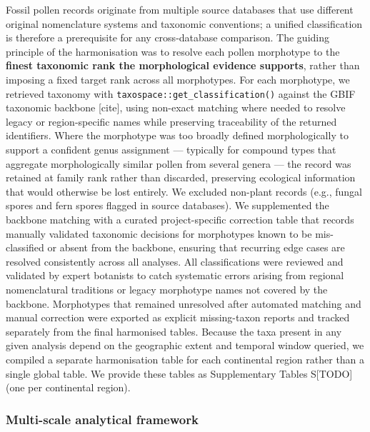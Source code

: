 \documentclass[
  12pt,
]{article}
\begin{document}
Fossil pollen records originate from multiple source databases that use
different original nomenclature systems and taxonomic conventions; a
unified classification is therefore a prerequisite for any
cross-database comparison. The guiding principle of the harmonisation
was to resolve each pollen morphotype to the \textbf{finest taxonomic
rank the morphological evidence supports}, rather than imposing a fixed
target rank across all morphotypes. For each morphotype, we retrieved
taxonomy with \texttt{taxospace::get\_classification()} against the GBIF
taxonomic backbone {[}cite{]}, using non-exact matching where needed to
resolve legacy or region-specific names while preserving traceability of
the returned identifiers. Where the morphotype was too broadly defined
morphologically to support a confident genus assignment --- typically
for compound types that aggregate morphologically similar pollen from
several genera --- the record was retained at family rank rather than
discarded, preserving ecological information that would otherwise be
lost entirely. We excluded non-plant records (e.g., fungal spores and
fern spores flagged in source databases). We supplemented the backbone
matching with a curated project-specific correction table that records
manually validated taxonomic decisions for morphotypes known to be
mis-classified or absent from the backbone, ensuring that recurring edge
cases are resolved consistently across all analyses. All classifications
were reviewed and validated by expert botanists to catch systematic
errors arising from regional nomenclatural traditions or legacy
morphotype names not covered by the backbone. Morphotypes that remained
unresolved after automated matching and manual correction were exported
as explicit missing-taxon reports and tracked separately from the final
harmonised tables. Because the taxa present in any given analysis depend
on the geographic extent and temporal window queried, we compiled a
separate harmonisation table for each continental region rather than a
single global table. We provide these tables as Supplementary Tables
S{[}TODO{]} (one per continental region).

\subsubsection{Multi-scale analytical
framework}\label{multi-scale-analytical-framework}
\end{document}
